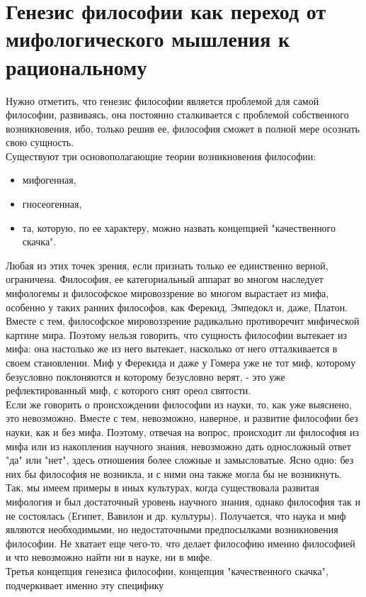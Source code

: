 \documentclass[12pt]{article}
\begin{document}
\section{Генезис философии как переход от мифологического мышления к рациональному}
Нужно отметить, что генезис философии является проблемой для самой философии, развиваясь, она постоянно
сталкивается с проблемой собственного возникновения, ибо, только решив ее, философия сможет в полной мере
осознать свою сущность.\\
Существуют три основополагающие теории возникновения философии:
\begin{itemize}
\item мифогенная,
\item гносеогенная,
\item та, которую, по ее характеру, можно назвать концепцией "качественного скачка".
\end{itemize}
Любая из этих точек зрения, если
признать только ее единственно верной, ограничена. Философия, ее категориальный аппарат во многом
наследует мифологемы и философское мировоззрение во многом вырастает из мифа, особенно у таких ранних
философов, как Ферекид, Эмпедокл и, даже, Платон. Вместе с тем, философское мировоззрение радикально
противоречит мифической картине мира. Поэтому нельзя говорить, что сущность философии вытекает из мифа:
она настолько же из него вытекает, насколько от него отталкивается в своем становлении. Миф у Ферекида и
даже у Гомера уже не тот миф, которому безусловно поклоняются и которому безусловно верят, - это уже
рефлектированный миф, с которого снят ореол святости.\\
Если же говорить о происхождении философии из науки, то, как уже выяснено, это невозможно. Вместе с тем,
невозможно, наверное, и развитие философии без науки, как и без мифа. Поэтому, отвечая на вопрос,
происходит ли философия из мифа или из накопления научного знания, невозможно дать односложный ответ
"да" или "нет", здесь отношения более сложные и замысловатые. Ясно одно: без них бы философия не возникла,
и с ними она также могла бы не возникнуть. Так, мы имеем примеры в иных культурах, когда существовала
развитая мифология и был достаточный уровень научного знания, однако философия так и не состоялась
(Египет, Вавилон и др. культуры). Получается, что наука и миф являются необходимыми, но недостаточными
предпосылками возникновения философии. Не хватает еще чего-то, что делает философию именно философией
и что невозможно найти ни в науке, ни в мифе.\\
Третья концепция генезиса философии, концепция "качественного скачка", подчеркивает именно эту специфику
\end{document}
